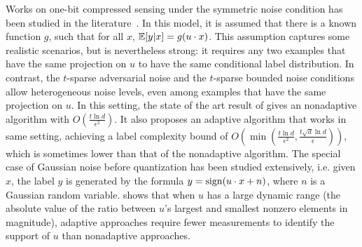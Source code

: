 Works on one-bit compressed sensing under the symmetric noise condition has been studied in the literature~\citep{PV13b, ZYJ14, CB15, ZG15}. In this model, it is assumed that there is a known function $g$, such that for all $x$, $\mathbb{E}[y|x] = g(u \cdot x)$. This assumption captures some realistic scenarios, but is nevertheless strong: it requires any two examples that have the same projection on $u$ to have the same conditional label distribution. In contrast, the $t$-sparse adversarial noise and the $t$-sparse bounded noise conditions allow heterogeneous noise levels, even among examples that have the same projection on $u$.
In this setting, the state of the art result of \cite{ZYJ14} gives an nonadaptive algorithm with $O(\frac{t \ln d}{ \epsilon^2})$. It also proposes an adaptive algorithm that works in same setting, achieving a label complexity bound of $O(\min(\frac{t \ln d}{\epsilon^2}, \frac{t\sqrt{d} \ln d}{\epsilon}))$, which is sometimes lower than that of the nonadaptive algorithm.
The special case of Gaussian noise before quantization has been studied extensively, i.e. given $x$, the label $y$ is generated by the formula $y = \operatorname{sign}(u \cdot x + n)$, where $n$ is a Gaussian random variable. \cite{GNR10} shows that when $u$ has a large dynamic range (the absolute value of the ratio between $u$'s largest and smallest nonzero elements in magnitude), adaptive approaches require fewer measurements to identify the support of $u$ than nonadaptive approaches.



